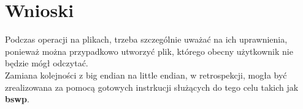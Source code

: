 \documentclass[11pt]{report}
\begin{document}
\section{Wnioski}
Podczas operacji na plikach, trzeba szczególnie uważać na ich uprawnienia, ponieważ można przypadkowo utworzyć plik, którego obecny użytkownik nie będzie mógł odczytać.\\
Zamiana kolejności z big endian na little endian, w retrospekcji, mogła być zrealizowana za pomocą gotowych instrkucji służących do tego celu takich jak \textbf{bswp}.
\label{sec:wnioski}
\end{document}
